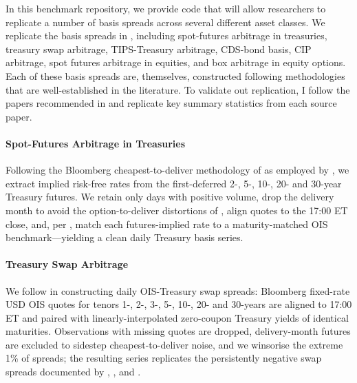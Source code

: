 \documentclass{article}
\begin{document}
In this benchmark repository, we provide code that will allow researchers to replicate a number of basis spreads across several different asset classes. We replicate the basis spreads in \cite{Siriwardane2021}, including spot-futures arbitrage in treasuries, treasury swap arbitrage, TIPS-Treasury arbitrage, CDS-bond basis, CIP arbitrage, spot futures arbitrage in equities, and box arbitrage in equity options.
Each of these basis spreads are, themselves, constructed following methodologies that are well-established in the literature. To validate out replication, I follow the papers recommended in \cite{Siriwardane2021} and replicate key summary statistics from each source paper.





\paragraph{Spot-Futures Arbitrage in Treasuries}
Following the Bloomberg cheapest-to-deliver methodology of \citet{Fleckenstein2020} as employed by \citet{Siriwardane2021}, we extract implied risk-free rates from the first-deferred 2-, 5-, 10-, 20- and 30-year Treasury futures.  We retain only days with positive volume, drop the delivery month to avoid the option-to-deliver distortions of \citet{Burghardt2005}, align quotes to the 17:00 ET close, and, per \citet{Barth2021}, match each futures-implied rate to a maturity-matched OIS benchmark—yielding a clean daily Treasury basis series.

\paragraph{Treasury Swap Arbitrage}
We follow \citet{Siriwardane2021} in constructing daily OIS-Treasury swap
spreads: Bloomberg fixed-rate USD OIS quotes for tenors 1-, 2-, 3-, 5-, 10-, 20-
and 30-years are aligned to 17:00 ET and paired with linearly-interpolated
zero-coupon Treasury yields of identical maturities.  Observations with missing
quotes are dropped, delivery-month futures are excluded to sidestep
cheapest-to-deliver noise, and we winsorise the extreme 1\% of spreads; the
resulting series replicates the persistently negative swap spreads documented by
\citet{Jermann2020}, \citet{Du2023}, and \citet{Hanson2023}.
\end{document}
